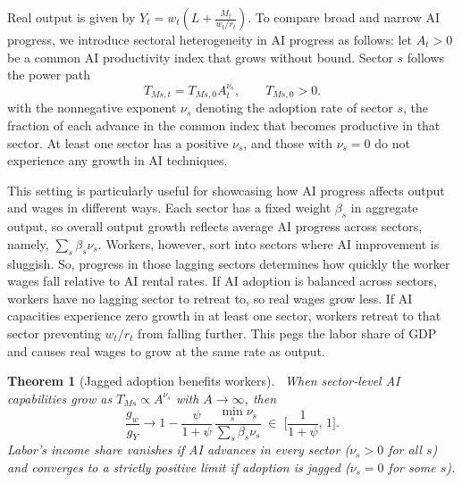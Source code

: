 \documentclass[11pt]{article}
\newtheorem{theorem}{Theorem}
\begin{document}
Real output is given by $Y_{t}=w_{t}\left(L+\frac{M_{t}}{w_{t}/r_{t}}\right)$.
To compare broad and narrow AI progress, we introduce sectoral heterogeneity
in AI progress as follows: let $A_{t}>0$ be a common AI productivity
index that grows without bound. Sector $s$ follows the power path
\begin{equation}
T_{Ms,t}=T_{Ms,0}A^{\nu_{s}}_{t},\qquad T_{Ms,0}>0.\label{eq:power-paths}
\end{equation}
with the nonnegative exponent $\nu_{s}$ denoting the adoption rate
of sector $s$, the fraction of each advance in the common index that
becomes productive in that sector. At least one sector has a positive
$\nu_{s}$, and those with $\nu_{s}=0$ do not experience any growth
in AI techniques.

This setting is particularly useful for showcasing how AI progress
affects output and wages in different ways. Each sector has a fixed
weight $\beta_{s}$ in aggregate output, so overall output growth
reflects average AI progress across sectors, namely, $\sum_{s}\beta_{s}\nu_{s}$.
Workers, however, sort into sectors where AI improvement is sluggish.
So, progress in those lagging sectors determines how quickly the worker
wages fall relative to AI rental rates. If AI adoption is balanced
across sectors, workers have no lagging sector to retreat to, so real
wages grow less. If AI capacities experience zero growth in at least
one sector, workers retreat to that sector preventing $w_{t}/r_{t}$
from falling further. This pegs the labor share of GDP and causes
real wages to grow at the same rate as output.

\begin{theorem}[Jagged adoption benefits workers]\label{thm:breadth}
~When sector-level AI capabilities grow as $T_{Ms}\propto A^{\nu_{s}}$
with $A\to\infty$, then 
\begin{equation}
\frac{g_{w}}{g_{Y}}\longrightarrow1-\frac{\psi}{1+\psi}\,\frac{\min_{s}\nu_{s}}{\sum_{s}\beta_{s}\nu_{s}}\;\in\;\Big[\frac{1}{1+\psi},\,1\Big].\label{eq:breadth-incidence}
\end{equation}
Labor's income share vanishes if AI advances in every sector ($\nu_{s}>0$
for all $s$) and converges to a strictly positive limit if adoption
is jagged ($\nu_{s}=0$ for some $s$). \end{theorem}
\end{document}
